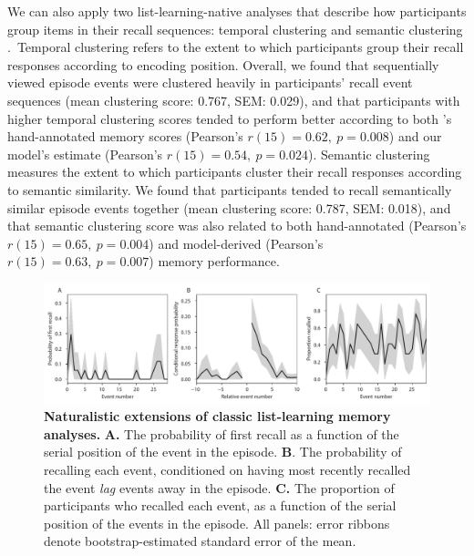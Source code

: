 \documentclass{article}
\begin{document}
We can also apply two list-learning-native analyses that describe how participants group items in their recall sequences: temporal clustering and semantic clustering \citep[][see \textit{Methods} for details]{PolyEtal09}.~Temporal clustering refers to the extent to which participants group their recall responses according to encoding position.  Overall, we found that sequentially viewed episode events were clustered heavily in participants' recall event sequences (mean clustering score: 0.767, SEM: 0.029), and that participants with higher temporal clustering scores tended to perform better according to both \cite{ChenEtal17}'s hand-annotated memory scores (Pearson's $r(15) = 0.62,~p = 0.008$) and our model's estimate (Pearson's $r(15) = 0.54,~p = 0.024$).  Semantic clustering measures the extent to which participants cluster their recall responses according to semantic similarity.  We found that participants tended to recall semantically similar episode events together (mean clustering score: 0.787, SEM: 0.018), and that semantic clustering score was also related to both hand-annotated  (Pearson's $r(15) = 0.65,~p = 0.004$) and model-derived (Pearson's $r(15) = 0.63,~p = 0.007$) memory performance.

\begin{figure}[t]
  \centering
  \includegraphics[width=1\textwidth]{figs/list_learning}
  \caption{\small \textbf{Naturalistic extensions of classic list-learning memory analyses.} \textbf{A.} The probability of first recall as a function of the serial position of the event in the episode. \textbf{B}.  The probability of recalling each event, conditioned on having most recently recalled the event \textit{lag} events away in the episode.  \textbf{C.} The proportion of participants who recalled each event, as a function of the serial position of the events in the episode.  All panels: error ribbons denote bootstrap-estimated standard error of the mean.}
  \label{fig:list-learning}
\end{figure}
\end{document}
